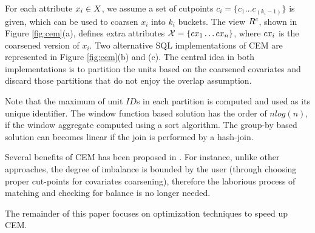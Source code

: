 
For each attribute $x_i \in {{X}}$, we assume a set of cutpoints
$c_i=\{c_{1} \ldots c_{(k_i-1)}\}$ is given, which can be used to
coarsen $x_i$ into $k_i$ buckets. The view ${{R}^c}$, shown in Figure
\ref{fig:cem}(a), defines extra attributes
${{\mathcal{X}}}=\{{{{cx}}}_1 \ldots {{{cx}}}_n\}$, where ${{{cx}}}_i$ is the coarsened
version of $x_i$. Two alternative SQL implementations of CEM are
represented in Figure \ref{fig:cem}(b) and (c).  The central idea in
both implementations is to partition the units based on the coarsened
covariates and discard those partitions that do not enjoy the overlap assumption.
 Note that the maximum of unit
$ID$s in each partition is computed and used as its unique
identifier. The window function based solution has the order of
$nlog(n)$, if the window aggregate computed using a sort
algorithm. The group-by based solution can becomes linear if the join
is performed by a hash-join.


Several benefits of CEM has been proposed in \cite{IacKinPor09}. For
instance, unlike other approaches, the degree of imbalance is bounded
by the user (through choosing proper cut-points for covariates
coarsening), therefore the laborious process of matching and checking
for balance is no longer needed.   The remainder of this paper focuses on
optimization techniques to speed up CEM.


\vspace{-2mm} 